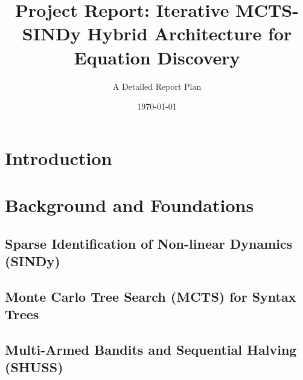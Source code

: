 \documentclass[11pt, a4paper]{article}
\title{\textbf{Project Report: Iterative MCTS-SINDy Hybrid Architecture for Equation Discovery}}
\author{A Detailed Report Plan}
\date{\today}
\begin{document}
\maketitle

\begin{abstract}
\end{abstract}

\section{Introduction}

\section{Background and Foundations}
\subsection{Sparse Identification of Non-linear Dynamics (SINDy)}

\subsection{Monte Carlo Tree Search (MCTS) for Syntax Trees}

\subsection{Multi-Armed Bandits and Sequential Halving (SHUSS)}
\end{document}
